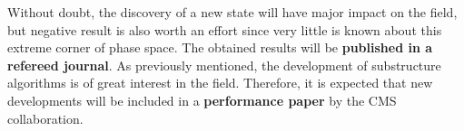 \textcolor{\mycolor}{
Without doubt, the discovery of a new state will have major impact on the field, but negative result is also worth an effort since very little is known about this extreme corner of phase space. The obtained results will be \textbf{published in a refereed journal}. As previously mentioned, the development of substructure algorithms is of great interest in the field. Therefore, it is expected that new developments will be included in a \textbf{performance paper} by the CMS collaboration.
}


